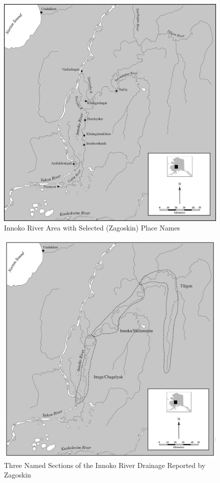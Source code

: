 \clearpage
\begin{figure}[h]
    \centering
    \includegraphics[width=\textwidth]{figures/pratt-fig3.png}
    \caption{Innoko River Area with Selected (Zagoskin) Place Names }
    \label{pratt-fig3}
\end{figure}

\clearpage
\begin{figure}[h]
    \centering
    \includegraphics[width=\textwidth]{figures/pratt-fig4.png}
    \caption{Three Named Sections of the Innoko River Drainage Reported by Zagoskin}
    \label{pratt-fig4}
\end{figure}

